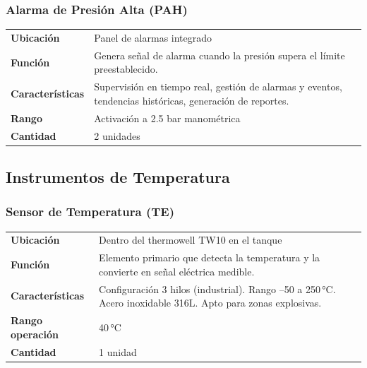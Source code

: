 \documentclass[12pt,letterpaper]{article}
\begin{document}
\subsubsection{Alarma de Presión Alta (PAH)}

\begin{especbox}[title={PAH — Siemens WinCC}]
\renewcommand{\arraystretch}{1.25}
\begin{tabular}{L{4cm} L{9.5cm}}
\textbf{Ubicación}       & Panel de alarmas integrado \\
\textbf{Función}         & Genera señal de alarma cuando la presión supera el límite preestablecido. \\
\textbf{Características} & Supervisión en tiempo real, gestión de alarmas y eventos, tendencias históricas, generación de reportes. \\
\textbf{Rango}           & Activación a 2.5 bar manométrica \\
\textbf{Cantidad}        & 2 unidades \\
\end{tabular}
\end{especbox}

\subsection{Instrumentos de Temperatura}

\subsubsection{Sensor de Temperatura (TE)}

\begin{especbox}[title={TE — Siemens SITRANS TS100 (PT100)}]
\renewcommand{\arraystretch}{1.25}
\begin{tabular}{L{4cm} L{9.5cm}}
\textbf{Ubicación}       & Dentro del thermowell TW10 en el tanque \\
\textbf{Función}         & Elemento primario que detecta la temperatura y la convierte en señal eléctrica medible. \\
\textbf{Características} & Configuración 3 hilos (industrial). Rango --50 a 250\,°C. Acero inoxidable 316L. Apto para zonas explosivas. \\
\textbf{Rango operación} & 40\,°C \\
\textbf{Cantidad}        & 1 unidad \\
\end{tabular}
\end{especbox}
\end{document}
